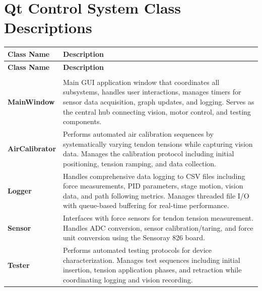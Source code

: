 \newpage
{} %
\section{Qt Control System Class Descriptions}
\begin{longtable}{|>{\raggedright\arraybackslash}p{}|>{\raggedright\arraybackslash}p{}|}
\toprule
\textbf{Class Name} & \textbf{Description} \\
\midrule
\endfirsthead

\toprule
\textbf{Class Name} & \textbf{Description} \\
\midrule
\endhead

\bottomrule
\endfoot

\bottomrule
\endlastfoot

\rowcolor{folderblue}
\multicolumn{2}{|c|}{\textcolor{white}{\textbf{\large  Root Directory (Ribbot/)}}} \\
\midrule
\cellcolor{lightblue}\textbf{MainWindow} & Main GUI application window that coordinates all subsystems, handles user interactions, manages timers for sensor data acquisition, graph updates, and logging. Serves as the central hub connecting vision, motor control, and testing components. \\
\hline
\cellcolor{lightblue}\textbf{AirCalibrator} & Performs automated air calibration sequences by systematically varying tendon tensions while capturing vision data. Manages the calibration protocol including initial positioning, tension ramping, and data collection. \\
\hline
\cellcolor{lightblue}\textbf{Logger} & Handles comprehensive data logging to CSV files including force measurements, PID parameters, stage motion, vision data, and path following metrics. Manages threaded file I/O with queue-based buffering for real-time performance. \\
\hline
\cellcolor{lightblue}\textbf{Sensor} & Interfaces with force sensors for tendon tension measurement. Handles ADC conversion, sensor calibration/taring, and force unit conversion using the Sensoray 826 board. \\
\hline
\cellcolor{lightblue}\textbf{Tester} & Performs automated testing protocols for device characterization. Manages test sequences including initial insertion, tension application phases, and retraction while coordinating logging and vision recording. \\
\midrule


\end{longtable}
